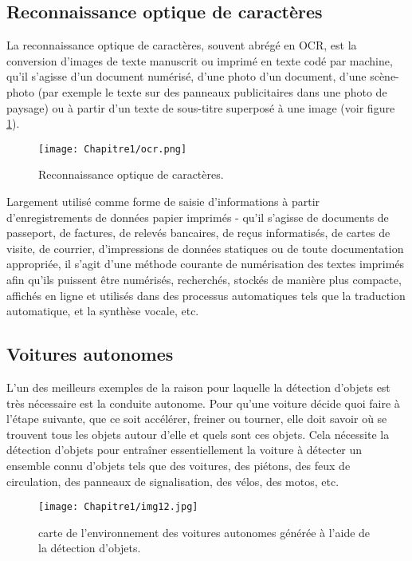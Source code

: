      \subsection{Reconnaissance optique de caractères }
La reconnaissance optique de caractères, souvent abrégé en OCR, est la conversion d'images de texte  manuscrit ou imprimé en texte codé par machine, qu'il s'agisse d'un document numérisé, d'une photo d'un document, d'une scène-photo (par exemple le texte sur des panneaux  publicitaires dans une photo de paysage) ou à partir d'un texte de sous-titre superposé à une image (voir figure \ref{ocr}).
\begin{figure}[H]
\centering
\texttt{[image: Chapitre1/ocr.png]}
\caption{Reconnaissance optique de caractères.}
\label{ocr}
\end{figure}     
Largement utilisé comme forme de saisie d'informations à partir d'enregistrements de données papier imprimés - qu'il s'agisse de documents de passeport, de factures, de relevés bancaires, de reçus informatisés, de cartes de visite, de courrier, d'impressions de données statiques ou de toute documentation appropriée, il s'agit d'une méthode courante de numérisation des textes imprimés afin qu'ils puissent être numérisés, recherchés, stockés de manière plus compacte, affichés en ligne et utilisés dans des processus automatiques tels que la traduction automatique, et la synthèse vocale,  etc.
     
     \subsection{Voitures autonomes}
 L'un des meilleurs exemples de la raison pour laquelle la détection d'objets est très nécessaire est la conduite autonome. Pour qu'une voiture décide quoi faire à l'étape suivante, que ce soit accélérer, freiner ou tourner, elle doit savoir où se trouvent tous les objets autour d'elle et quels sont ces objets.  Cela nécessite la détection d'objets pour entraîner essentiellement la voiture à détecter un ensemble connu d'objets tels que des voitures, des piétons, des feux de circulation, des panneaux de signalisation, des vélos, des motos, etc.

      \begin{figure}[H]
          \centering
          \texttt{[image: Chapitre1/img12.jpg]}
          \caption{carte de l'environnement des voitures autonomes générée à l'aide de la détection d'objets.}
          \label{img12}
          \end{figure}
          
